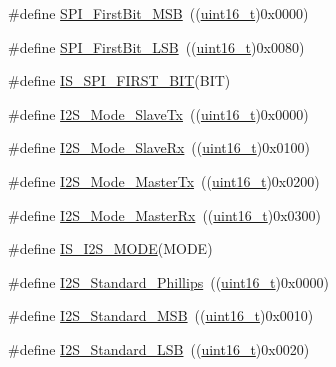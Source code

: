 \begin{DoxyCompactItemize}
\item 
\#define \hyperlink{group___s_p_i___m_s_b___l_s_b__transmission_ga45e688f93a93b605886240cad23bc2eb}{S\+P\+I\+\_\+\+First\+Bit\+\_\+\+M\+SB}~((\hyperlink{_p_e___types_8h_a1f1825b69244eb3ad2c7165ddc99c956}{uint16\+\_\+t})0x0000)
\item 
\#define \hyperlink{group___s_p_i___m_s_b___l_s_b__transmission_ga5ef57fca79434cbc517e4ede548ca02d}{S\+P\+I\+\_\+\+First\+Bit\+\_\+\+L\+SB}~((\hyperlink{_p_e___types_8h_a1f1825b69244eb3ad2c7165ddc99c956}{uint16\+\_\+t})0x0080)
\item 
\#define \hyperlink{group___s_p_i___m_s_b___l_s_b__transmission_gabee8e0302741f4a5c41b96af640c63ad}{I\+S\+\_\+\+S\+P\+I\+\_\+\+F\+I\+R\+S\+T\+\_\+\+B\+IT}(B\+IT)
\item 
\#define \hyperlink{group___i2_s___mode_gadd5b20277198fcdb6aa53ea48e802ae5}{I2\+S\+\_\+\+Mode\+\_\+\+Slave\+Tx}~((\hyperlink{_p_e___types_8h_a1f1825b69244eb3ad2c7165ddc99c956}{uint16\+\_\+t})0x0000)
\item 
\#define \hyperlink{group___i2_s___mode_gaaf62ee0353476afc9612dc2933e1c5c5}{I2\+S\+\_\+\+Mode\+\_\+\+Slave\+Rx}~((\hyperlink{_p_e___types_8h_a1f1825b69244eb3ad2c7165ddc99c956}{uint16\+\_\+t})0x0100)
\item 
\#define \hyperlink{group___i2_s___mode_ga3a62ee8964033a3f6fd030da9e40fba6}{I2\+S\+\_\+\+Mode\+\_\+\+Master\+Tx}~((\hyperlink{_p_e___types_8h_a1f1825b69244eb3ad2c7165ddc99c956}{uint16\+\_\+t})0x0200)
\item 
\#define \hyperlink{group___i2_s___mode_gabf9f872cda7c0f159c5fc18aed44e973}{I2\+S\+\_\+\+Mode\+\_\+\+Master\+Rx}~((\hyperlink{_p_e___types_8h_a1f1825b69244eb3ad2c7165ddc99c956}{uint16\+\_\+t})0x0300)
\item 
\#define \hyperlink{group___i2_s___mode_ga942c37b2c1274c4c5773ddcf8b46d9b5}{I\+S\+\_\+\+I2\+S\+\_\+\+M\+O\+DE}(M\+O\+DE)
\item 
\#define \hyperlink{group___i2_s___standard_gacdb89d66a2a941924ff4b7a8d14884f9}{I2\+S\+\_\+\+Standard\+\_\+\+Phillips}~((\hyperlink{_p_e___types_8h_a1f1825b69244eb3ad2c7165ddc99c956}{uint16\+\_\+t})0x0000)
\item 
\#define \hyperlink{group___i2_s___standard_gae716cfa7e031affc37fe65dd80b0e6f4}{I2\+S\+\_\+\+Standard\+\_\+\+M\+SB}~((\hyperlink{_p_e___types_8h_a1f1825b69244eb3ad2c7165ddc99c956}{uint16\+\_\+t})0x0010)
\item 
\#define \hyperlink{group___i2_s___standard_ga88bc9001a13b95a0844d81fea2080df6}{I2\+S\+\_\+\+Standard\+\_\+\+L\+SB}~((\hyperlink{_p_e___types_8h_a1f1825b69244eb3ad2c7165ddc99c956}{uint16\+\_\+t})0x0020)

\end{DoxyCompactItemize}
